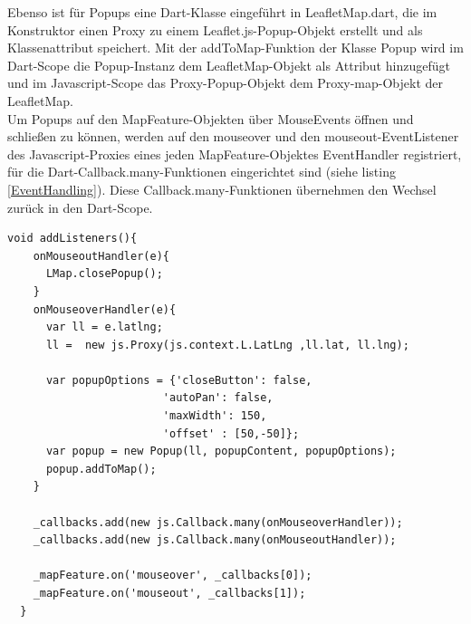 Ebenso ist für Popups eine Dart-Klasse eingeführt in LeafletMap.dart, die im Konstruktor einen Proxy zu einem Leaflet.js-Popup-Objekt erstellt und als Klassenattribut speichert. Mit der addToMap-Funktion der Klasse Popup wird im Dart-Scope die Popup-Instanz dem LeafletMap-Objekt als Attribut hinzugefügt und im Javascript-Scope das Proxy-Popup-Objekt dem Proxy-map-Objekt der LeafletMap.\\ Um Popups auf den MapFeature-Objekten über MouseEvents öffnen und schließen zu können, werden auf den mouseover und den mouseout-EventListener des Javascript-Proxies eines jeden MapFeature-Objektes EventHandler registriert, für die Dart-Callback.many-Funktionen eingerichtet sind (siehe listing \ref{EventHandling}). Diese Callback.many-Funktionen übernehmen den Wechsel zurück in den Dart-Scope.
\begin{lstlisting}[caption=EventHandling mithilfe von Callback-Funktionen, label= EventHandling]
void addListeners(){
    onMouseoutHandler(e){
      LMap.closePopup();
    }
    onMouseoverHandler(e){
      var ll = e.latlng;
      ll =  new js.Proxy(js.context.L.LatLng ,ll.lat, ll.lng);
      
      var popupOptions = {'closeButton': false,
                        'autoPan': false,
                        'maxWidth': 150, 
                        'offset' : [50,-50]};
      var popup = new Popup(ll, popupContent, popupOptions);
      popup.addToMap();
    }
    
    _callbacks.add(new js.Callback.many(onMouseoverHandler));
    _callbacks.add(new js.Callback.many(onMouseoutHandler));
    
    _mapFeature.on('mouseover', _callbacks[0]);
    _mapFeature.on('mouseout', _callbacks[1]);
  }
  \end{lstlisting}